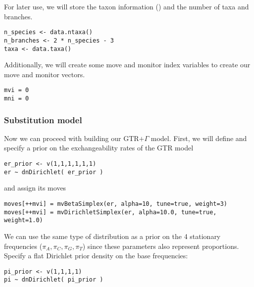 For later use, we will store the taxon information () and the number of taxa and branches.
{\tt \begin{snugshade*}
\begin{lstlisting}
n_species <- data.ntaxa()
n_branches <- 2 * n_species - 3
taxa <- data.taxa()
\end{lstlisting}
\end{snugshade*}}

Additionally, we will create some move and monitor index variables to create our move and monitor vectors.
{\tt \begin{snugshade*}
\begin{lstlisting}
mvi = 0
mni = 0
\end{lstlisting}
\end{snugshade*}}

\subsubsection{Substitution model}

Now we can proceed with building our GTR$+\Gamma$ model.
First, we will define and specify a prior on the exchangeability rates of the GTR model

{\tt \begin{snugshade*}
\begin{lstlisting}
er_prior <- v(1,1,1,1,1,1) 
er ~ dnDirichlet( er_prior )
\end{lstlisting}
\end{snugshade*}}

and assign its moves

{\tt \begin{snugshade*}
\begin{lstlisting}
moves[++mvi] = mvBetaSimplex(er, alpha=10, tune=true, weight=3) 
moves[++mvi] = mvDirichletSimplex(er, alpha=10.0, tune=true, weight=1.0)
\end{lstlisting}
\end{snugshade*}}

We can use the same type of distribution as a prior on the 4 stationary frequencies ($\pi_A, \pi_C, \pi_G, \pi_T$) since these parameters also represent proportions. 
Specify a flat Dirichlet prior density on the base frequencies:
{\tt \begin{snugshade*}
\begin{lstlisting}
pi_prior <- v(1,1,1,1) 
pi ~ dnDirichlet( pi_prior )
\end{lstlisting}
\end{snugshade*}}

